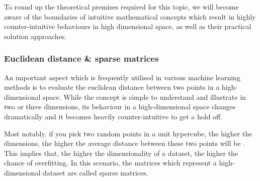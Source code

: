 
To round up the theoretical premises required for this topic, we will become aware of the boundaries of intuitive mathematical concepts which result in highly counter-intuitive behaviours in high dimensional space, as well as their practical solution approaches.

\subsubsection{Euclidean distance \& sparse matrices}

An important aspect which is frequently utilised in various machine learning methods is to evaluate the euclidean distance between two points in a high-dimensional space.
While the concept is simple to understand and illustrate in two or three dimensions, its behaviour in a high-dimensional space changes dramatically and it becomes heavily counter-intuitive to get a hold off.

Most notably, if you pick two random points in a unit hypercube, the higher the dimensions, the higher the average distance between these two points will be \cite{HandsOnMLCh8}.
This implies that, the higher the dimensionality of a dataset, the higher the chance of overfitting.
In this scenario, the matrices which represent a high-dimensional dataset are called sparse matrices.

\vspace{2mm}

